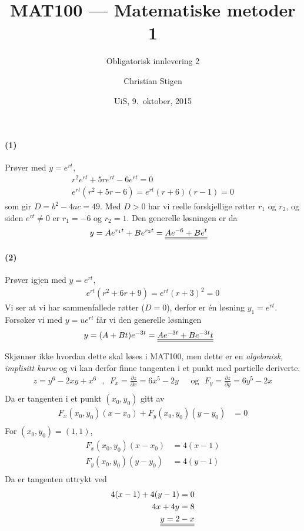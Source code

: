 \documentclass[a4paper,norsk,12pt]{article}
\title{MAT100 --- Matematiske metoder 1}
\subtitle{Obligatorisk innlevering 2}
\author{Christian Stigen}
\date{UiS, 9.~oktober, 2015}
\begin{document}
\maketitle

\paragraph{(1)} Prøver med $y=e^{rt}$,
\begin{align*}
  r^2e^{rt} + 5re^{rt} - 6e^{rt} = 0 \\
  e^{rt}(r^2+5r-6) = e^{rt}(r+6)(r-1) = 0
\end{align*}
%
som gir $D = b^2 - 4ac = 49$. Med $D > 0$ har vi reelle forskjellige røtter
$r_1$ og $r_2$, og siden $e^{rt} \neq 0$ er $r_1=-6$ og $r_2=1$. Den generelle
løsningen er da
%
\begin{align*}
  y & = Ae^{r_1t} + Be^{r_2t} = {\underline{\underline{Ae^{-6} + Be^t}}}
\end{align*}

\paragraph{(2)} Prøver igjen med $y=e^{rt}$,
\begin{align*}
  e^{rt}(r^2 + 6r + 9) = e^{rt}(r+3)^2 = 0
\end{align*}
Vi ser at vi har sammenfallede røtter ($D=0$), derfor er én løsning $y_1 =
e^{rt}$. Forsøker vi med $y = ue^{rt}$ får vi den generelle løsningen
\begin{align*}
  y & = (A + Bt)e^{-3t} = {\underline{\underline{Ae^{-3t} + Be^{-3t}t}}}
\end{align*}

Skjønner ikke hvordan dette skal løses i MAT100, men dette er en
\textit{algebraisk, implisitt kurve} og vi kan derfor finne tangenten i et
punkt med partielle deriverte.
\begin{align*}
  z = y^6 - 2xy + x^6 \text{ ~,~ }
  F_x = \frac{ \partial z }{ \partial x } = 6x^5 - 2y & \text{ ~og~ }
  F_y = \frac{ \partial z }{ \partial y } = 6y^5 - 2x \\
\end{align*}
Da er tangenten i et punkt $(x_0, y_0)$ gitt av
\begin{align*}
  F_x(x_0, y_0)(x - x_0) + F_y(x_0, y_0)(y - y_0) & = 0 \\
\end{align*}
For $(x_0, y_0) = (1, 1)$,
\begin{align*}
  F_x(x_0, y_0)(x - x_0) & = 4(x-1) \\
  F_y(x_0, y_0)(y - y_0) & = 4(y-1) \\
\end{align*}
Da er tangenten uttrykt ved
\begin{align*}
  4(x-1) + 4(y-1) = 0 \\
  4x + 4y = 8 \\
  {\underline{\underline{y  = 2 - x}}}
\end{align*}
\end{document}
